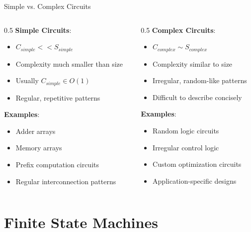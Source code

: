 \documentclass[aspectratio=169,11pt]{beamer}
\newcommand{\concept}[1]{\textbf{\color{accentcolor}#1}}
\begin{document}
\begin{frame}{Simple vs. Complex Circuits}
\begin{columns}
\begin{column}{0.5\textwidth}
\concept{Simple Circuits}:
\begin{itemize}
\item $C_{simple} << S_{simple}$
\item Complexity much smaller than size
\item Usually $C_{simple} \in O(1)$
\item Regular, repetitive patterns
\end{itemize}

\vspace{0.3cm}
\concept{Examples}:
\begin{itemize}
\item Adder arrays
\item Memory arrays
\item Prefix computation circuits
\item Regular interconnection patterns
\end{itemize}
\end{column}
\begin{column}{0.5\textwidth}
\concept{Complex Circuits}:
\begin{itemize}
\item $C_{complex} \sim S_{complex}$
\item Complexity similar to size
\item Irregular, random-like patterns
\item Difficult to describe concisely
\end{itemize}

\vspace{0.3cm}
\concept{Examples}:
\begin{itemize}
\item Random logic circuits
\item Irregular control logic
\item Custom optimization circuits
\item Application-specific designs
\end{itemize}
\end{column}
\end{columns}
\end{frame}

\section{Finite State Machines}
\end{document}
